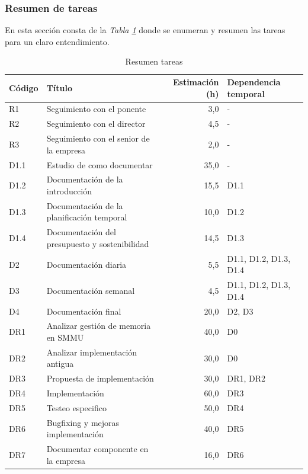 \documentclass[12pt]{article}
\begin{document}
     \subsubsection{Resumen de tareas}
    En esta sección consta de la \textit{Tabla \ref{tab:tareas}} donde se enumeran y resumen las tareas para un claro entendimiento.

    \begin{table}[H]
    \begin{center}
        \begin{tabular}{ |l|l|r|p{}| } \hline
    Código&Título&Estimación (h)&Dependencia temporal \\\hline
    R1&Seguimiento con el ponente&3,0&-\\\hline
    R2&Seguimiento con el director&4,5&-\\\hline
    R3&Seguimiento con el senior de la empresa&2,0&-\\\hline
    D1.1&Estudio de como documentar&35,0&-\\\hline
    D1.2&Documentación de la introducción&15,5&D1.1\\\hline
    D1.3&Documentación de la planificación temporal&10,0&D1.2\\\hline 
    D1.4&Documentación del presupuesto y sostenibilidad&14,5&D1.3\\\hline
    D2& Documentación diaria&5,5&D1.1, D1.2, D1.3, D1.4\\\hline
    D3& Documentación semanal&4,5&D1.1, D1.2, D1.3, D1.4\\\hline
    D4& Documentación final&20,0&D2, D3\\\hline
    DR1&Analizar gestión de memoria en SMMU&40,0&D0\\\hline
    DR2&Analizar implementación antigua&30,0&D0\\\hline
    DR3&Propuesta de implementación&30,0&DR1, DR2\\\hline
    DR4&Implementación&60,0&DR3\\\hline
    DR5&Testeo especifico&50,0&DR4\\\hline
    DR6&Bugfixing y mejoras implementación&40,0&DR5\\\hline
    DR7&Documentar componente en la empresa&16,0&DR6\\\hline
    \end{tabular}
    \caption{Resumen tareas}
    \label{tab:tareas}
    \end{center}
  \end{table}
  
\end{document}
